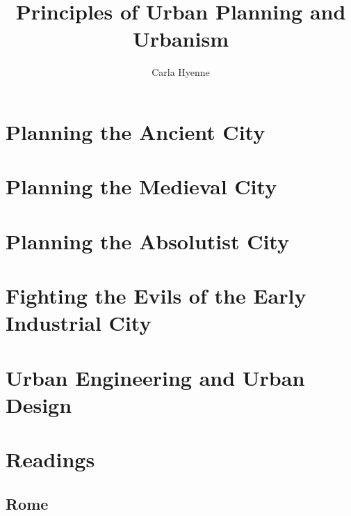 \documentclass{article}
\title{Principles of Urban Planning and Urbanism}
\author{Carla Hyenne}
\begin{document}
\maketitle

\tableofcontents

\pagebreak

\section{Planning the Ancient City}

\section{Planning the Medieval City}

\section{Planning the Absolutist City}

\section{Fighting the Evils of the Early Industrial City}

\section{Urban Engineering and Urban Design}

\section{Readings}

\subsection{Rome}
\end{document}
